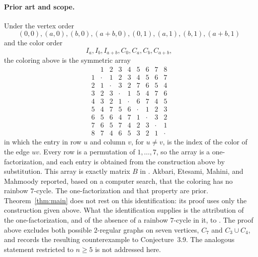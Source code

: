 \documentclass[11pt]{amsart}
\begin{document}
\paragraph{Prior art and scope.}
Under the vertex order
\[
 (0,0),(a,0),(b,0),(a+b,0),(0,1),(a,1),(b,1),(a+b,1)
\]
and the color order
\[
 I_a,I_b,I_{a+b},C_0,C_a,C_b,C_{a+b},
\]
the coloring above is the symmetric array
\[
  \begin{array}{c|cccccccc}
      & 1      & 2      & 3      & 4      & 5      & 6      & 7      & 8      \\
    \hline
    1 & \cdot  & 1      & 2      & 3      & 4      & 5      & 6      & 7      \\
    2 & 1      & \cdot  & 3      & 2      & 7      & 6      & 5      & 4      \\
    3 & 2      & 3      & \cdot  & 1      & 5      & 4      & 7      & 6      \\
    4 & 3      & 2      & 1      & \cdot  & 6      & 7      & 4      & 5      \\
    5 & 4      & 7      & 5      & 6      & \cdot  & 1      & 2      & 3      \\
    6 & 5      & 6      & 4      & 7      & 1      & \cdot  & 3      & 2      \\
    7 & 6      & 5      & 7      & 4      & 2      & 3      & \cdot  & 1      \\
    8 & 7      & 4      & 6      & 5      & 3      & 2      & 1      & \cdot
  \end{array}
\]
in which the entry in row $u$ and column $v$, for $u\ne v$, is the index of
the color of the edge $uv$.  Every row is a permutation of $1,\dots,7$, so
the array is a one-factorization, and each entry is obtained from the
construction above by substitution.  This array is exactly matrix $B$ in
\cite{AEMM}.  Akbari, Etesami, Mahini, and
Mahmoody reported, based on a computer search, that the coloring has no
rainbow $7$-cycle.  The one-factorization and that property are prior.
Theorem~\ref{thm:main} does not rest on this identification: its proof uses
only the construction given above.  What the identification supplies is the
attribution of the one-factorization, and of the absence of a rainbow
$7$-cycle in it, to \cite{AEMM}.
The proof above excludes both possible $2$-regular graphs on seven
vertices, $C_7$ and $C_3\cup C_4$, and records the resulting
counterexample to Conjecture~3.9.  The analogous statement restricted to
$n\ge5$ is not addressed here.
\end{document}
